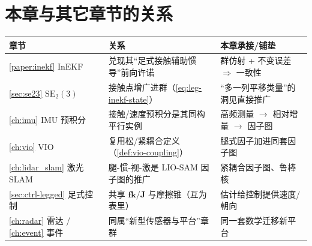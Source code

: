 \section*{本章与其它章节的关系}
\begin{table}[H]\centering\small
\begin{tabular}{lll}
\toprule
章节 & 关系 & 本章承接/铺垫 \\
\midrule
\cref{paper:inekf} InEKF & 兑现其“足式接触辅助惯导”前向许诺 & 群仿射 + 不变误差 $\Rightarrow$ 一致性 \\
\cref{sec:se23} $\mathrm{SE}_2(3)$ & 接触点增广进群（\cref{eq:leg-inekf-state}） & “多一列平移类量”的洞见直接推广 \\
\cref{ch:imu} IMU 预积分 & 接触/速度预积分是其同构平行实例 & 高频测量 $\to$ 相对增量 $\to$ 因子图 \\
\cref{ch:vio} VIO & 复用松/紧耦合定义（\cref{def:vio-coupling}） & 腿式因子加进同套因子图 \\
\cref{ch:lidar_slam} 激光 SLAM & 腿-惯-视-激是 LIO-SAM 因子图的推广 & 紧耦合因子图、鲁棒核 \\
\cref{sec:ctrl-legged} 足式控制 & 共享 $\mathbf{fk}/\mathbf{J}$ 与摩擦锥（互为表里） & 估计给控制提供速度/朝向 \\
\cref{ch:radar} 雷达 / \cref{ch:event} 事件 & 同属“新型传感器与平台”章群 & 同一套数学迁移新平台 \\
\bottomrule
\end{tabular}
\end{table}

